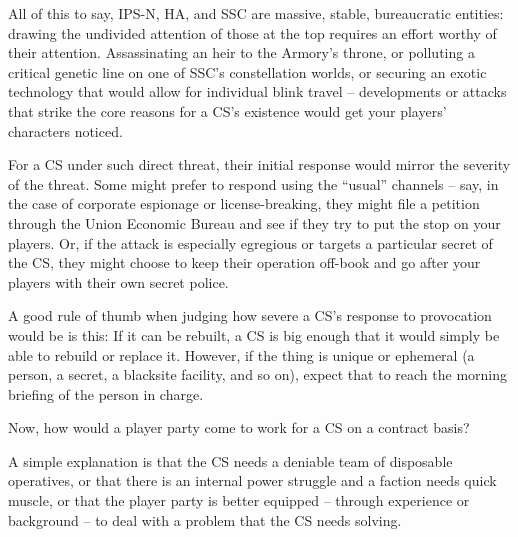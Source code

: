 All of this to say, IPS-N, HA, and SSC are massive, stable, bureaucratic entities: drawing the  
undivided attention of those at the top requires an effort worthy of their attention. Assassinating an  
heir to the Armory’s throne, or polluting a critical genetic line on one of SSC’s constellation worlds,  
or securing an exotic technology that would allow for individual blink travel -- developments or  
attacks that strike the core reasons for a CS’s existence would get your players’ characters  
noticed.      

For a CS under such direct threat, their initial response would mirror the severity of the threat.  
Some might prefer to respond using the “usual” channels -- say, in the case of corporate  
espionage or license-breaking, they might file a petition through the Union Economic Bureau and  
see if they try to put the stop on your players. Or, if the attack is especially egregious or targets a  
particular secret of the CS, they might choose to keep their operation off-book and go after your  
players with their own secret police.   

A good rule of thumb when judging how severe a CS’s response to provocation would be is this: If  
it can be rebuilt, a CS is big enough that it would simply be able to rebuild or replace it. However,  
if the thing is unique or ephemeral (a person, a secret, a blacksite facility, and so on), expect that  
to reach the morning briefing of the person in charge.   

Now, how would a player party come to work for a CS on a contract basis?   

A simple explanation is that the CS needs a deniable team of disposable operatives, or that there  
is an internal power struggle and a faction needs quick muscle, or that the player party is better  
equipped -- through experience or background -- to deal with a problem that the CS needs  
solving.   

                                                                                                               

